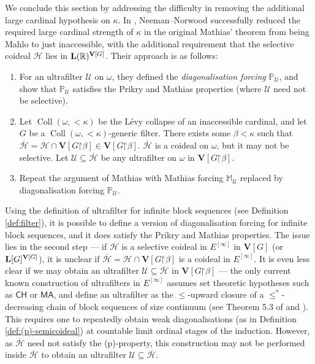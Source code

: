 \documentclass[10pt,a4paper]{amsart}
\theoremstyle{plain}
\numberwithin{equation}{section}
\theoremstyle{definition}
\newcommand{\func}{\operatorname}
\newcommand{\R}{\mathbb{R}}
\renewcommand{\P}{\mathbb{P}}
\renewcommand{\bar}[1]{\overline{#1}}
\newcommand{\cal}{\mathcal}
\renewcommand{\bf}{\mathbf}
\newcommand{\CH}{\mathsf{CH}}
\newcommand{\MA}{\mathsf{MA}}
\newcommand{\restrictedto}{\mathord{\upharpoonright}}
\newcommand{\Coll}{\func{Coll}}
\newcommand{\U}{\cal{U}}
\newcommand{\V}{\bf{V}}
\renewcommand{\H}{\cal{H}}
\let\strokeL\L
\DeclareRobustCommand{\L}{\ifmmode\mathbf{L}\else\strokeL\fi}
\begin{document}
We conclude this section by addressing the difficulty in removing the additional large cardinal hypothesis on $\kappa$. In \cite{NN18}, Neeman--Norwood successfully reduced the required large cardinal strength of $\kappa$ in the original Mathias' theorem \cite{M77} from being Mahlo to just inaccessible, with the additional requirement that the selective coideal $\H$ lies in $\L(\R)^{\V[G]}$. Their approach is as follows:
\begin{enumerate}
    \item For an ultrafilter $\U$ on $\omega$, they defined the \emph{diagonalisation forcing} $\P_\U$, and show that $\P_\U$ satisfies the Prikry and Mathias properties (where $\U$ need not be selective).
    
    \item Let $\Coll(\omega,<\!\kappa)$ be the L\'{e}vy collapse of an inaccessible cardinal, and let $G$ be a $\Coll(\omega,<\!\kappa)$-generic filter. There exists some $\beta < \kappa$ such that $\bar{\H} = \H \cap \V[G\restrictedto\beta] \in \V[G\restrictedto\beta]$. $\bar{\H}$ is a coideal on $\omega$, but it may not be selective. Let $\U \subseteq \bar{\H}$ be any ultrafilter on $\omega$ in $\V[G\restrictedto\beta]$.
    
    \item Repeat the argument of Mathias with Mathias forcing $\mathbb{M}_\U$ replaced by diagonalisation forcing $\P_\U$.
\end{enumerate}
Using the definition of ultrafilter for infinite block sequences (see Definition \ref{def:filter}), it is possible to define a version of diagonalisation forcing for infinite block sequences, and it does satisfy the Prikry and Mathias properties. The issue lies in the second step --- if $\H$ is a selective coideal in $E^{[\infty]}$ in $\V[G]$ (or $\L[G]^{\V[G]}$), it is unclear if $\bar{\H} = \H \cap \V[G\restrictedto\beta]$ is a coideal in $E^{[\infty]}$. It is even less clear if we may obtain an ultrafilter $\U \subseteq \bar{\H}$ in $\V[G\restrictedto\beta]$ --- the only current known construction of ultrafilters in $E^{[\infty]}$ assumes set theoretic hypotheses such as $\CH$ or $\MA$, and define an ultrafilter as the $\leq$-upward closure of a $\leq^*$-decreasing chain of block sequences of size continuum (see Theorem 5.3 of \cite{S18} and \cite{B87}). This requires one to repeatedly obtain weak diagonalisations (as in Definition \ref{def:(p)-semicoideal}) at countable limit ordinal stages of the induction. However, as $\bar{\H}$ need not satisfy the (p)-property, this construction may not be performed inside $\bar{\H}$ to obtain an ultrafilter $\U \subseteq \bar{\H}$. 
\end{document}
